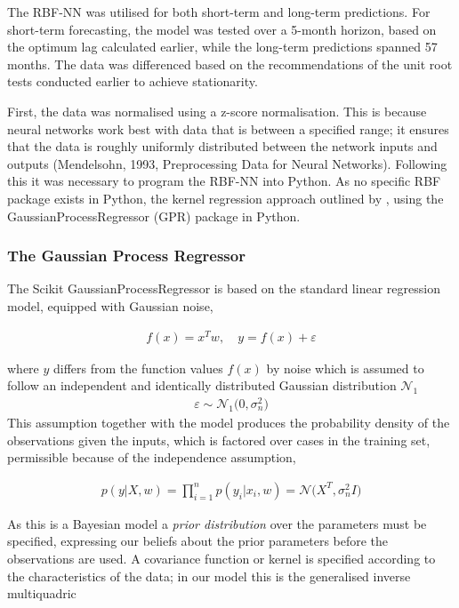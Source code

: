 \documentclass[11pt,a4paper]{article}
\newcommand{\citeboth}[1]{\citeauthor{#1} \citep{#1}}
\begin{document}
The RBF-NN was utilised for both short-term and long-term 
predictions. For short-term forecasting, 
the model was tested over a 5-month horizon, based on the optimum lag calculated earlier, while the long-term predictions spanned 57 months. 
The data was differenced based on the recommendations of the 
unit root tests conducted earlier to achieve stationarity. 

First, the data was normalised using a z-score normalisation. This is because
neural networks work best with data
that is between a specified range; it ensures that the data is roughly uniformly
distributed between the network inputs and outputs 
(Mendelsohn, 1993, Preprocessing Data for Neural Networks). Following this 
it was necessary to program the RBF-NN into Python. As no specific RBF package exists
in Python, the kernel regression approach outlined by 
\citeboth{bishop1995}, using the GaussianProcessRegressor (GPR) package in Python.

\subsubsection{The Gaussian Process Regressor}

The Scikit GaussianProcessRegressor is based on the 
standard linear regression 
model, equipped with Gaussian noise,

\begin{align} 
    f(x) = x^{T}w, \quad{y = f(x) + \varepsilon}
\end{align}

where $y$ differs from the function values $f(x)$ by noise which is assumed
to follow an independent and identically distributed Gaussian distribution
$\mathcal{N}_1$
\begin{align*}
    \varepsilon \sim \mathcal{N}_1 \bigl(0, \sigma_{n}^2\bigr)
\end{align*}
This assumption together with the model produces the 
probability density of the observations given the inputs, 
which is factored over cases in the training set, 
permissible because of the independence assumption,

\begin{align}
    p(y|X,w) = \prod_{i=1}^{n} p(y_i|x_i ,w) = \mathcal{N}\bigl(X^T, \sigma_{n}^2 I\bigr)
\end{align}

As this is a Bayesian model a \textit{prior distribution} over the parameters must be specified, 
expressing our beliefs about the prior
parameters before the observations are used. A covariance function or kernel
is specified according to the characteristics of the data; in our model this 
is the generalised inverse multiquadric
\end{document}
